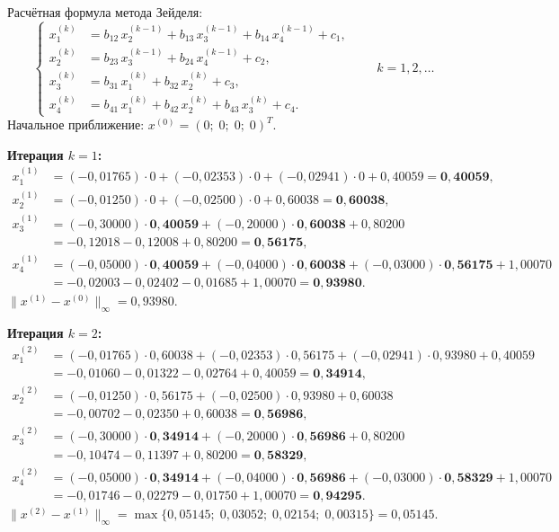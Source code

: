 \documentclass[a4paper, final]{article}
\begin{document}
Расчётная формула метода Зейделя:
\[
\left\{
\begin{aligned}
x_1^{(k)} &= b_{12}\,x_2^{(k-1)} + b_{13}\,x_3^{(k-1)} + b_{14}\,x_4^{(k-1)} + c_1,\\
x_2^{(k)} &= b_{23}\,x_3^{(k-1)} + b_{24}\,x_4^{(k-1)} + c_2,\\
x_3^{(k)} &= b_{31}\,x_1^{(k)} + b_{32}\,x_2^{(k)} + c_3,\\
x_4^{(k)} &= b_{41}\,x_1^{(k)} + b_{42}\,x_2^{(k)} + b_{43}\,x_3^{(k)} + c_4.
\end{aligned}
\right.\qquad k=1,2,\ldots
\]
Начальное приближение: $x^{(0)} = (0;\;0;\;0;\;0)^T$.

\medskip\textbf{Итерация $k=1$:}
\begin{align*}
x_1^{(1)} &= (-0{,}01765)\cdot0 + (-0{,}02353)\cdot0 + (-0{,}02941)\cdot0 + 0{,}40059 = \mathbf{0{,}40059},\\
x_2^{(1)} &= (-0{,}01250)\cdot0 + (-0{,}02500)\cdot0 + 0{,}60038 = \mathbf{0{,}60038},\\
x_3^{(1)} &= (-0{,}30000)\cdot\mathbf{0{,}40059} + (-0{,}20000)\cdot\mathbf{0{,}60038} + 0{,}80200\\
           &= -0{,}12018 - 0{,}12008 + 0{,}80200 = \mathbf{0{,}56175},\\
x_4^{(1)} &= (-0{,}05000)\cdot\mathbf{0{,}40059} + (-0{,}04000)\cdot\mathbf{0{,}60038}
             + (-0{,}03000)\cdot\mathbf{0{,}56175} + 1{,}00070\\
           &= -0{,}02003 - 0{,}02402 - 0{,}01685 + 1{,}00070 = \mathbf{0{,}93980}.
\end{align*}
$\|x^{(1)}-x^{(0)}\|_\infty = 0{,}93980.$

\medskip\textbf{Итерация $k=2$:}
\begin{align*}
x_1^{(2)} &= (-0{,}01765)\cdot0{,}60038 + (-0{,}02353)\cdot0{,}56175 + (-0{,}02941)\cdot0{,}93980 + 0{,}40059\\
           &= -0{,}01060 - 0{,}01322 - 0{,}02764 + 0{,}40059 = \mathbf{0{,}34914},\\
x_2^{(2)} &= (-0{,}01250)\cdot0{,}56175 + (-0{,}02500)\cdot0{,}93980 + 0{,}60038\\
           &= -0{,}00702 - 0{,}02350 + 0{,}60038 = \mathbf{0{,}56986},\\
x_3^{(2)} &= (-0{,}30000)\cdot\mathbf{0{,}34914} + (-0{,}20000)\cdot\mathbf{0{,}56986} + 0{,}80200\\
           &= -0{,}10474 - 0{,}11397 + 0{,}80200 = \mathbf{0{,}58329},\\
x_4^{(2)} &= (-0{,}05000)\cdot\mathbf{0{,}34914} + (-0{,}04000)\cdot\mathbf{0{,}56986}
             + (-0{,}03000)\cdot\mathbf{0{,}58329} + 1{,}00070\\
           &= -0{,}01746 - 0{,}02279 - 0{,}01750 + 1{,}00070 = \mathbf{0{,}94295}.
\end{align*}
$\|x^{(2)}-x^{(1)}\|_\infty = \max\{0{,}05145;\;0{,}03052;\;0{,}02154;\;0{,}00315\} = 0{,}05145.$
\end{document}
